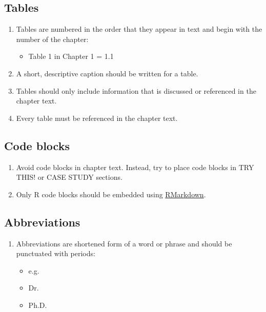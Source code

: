 \documentclass[
]{book}
\providecommand{\tightlist}{%
  \setlength{\itemsep}{0pt}\setlength{\parskip}{0pt}}
\begin{document}
\hypertarget{tables}{%
\subsection{Tables}\label{tables}}

\begin{enumerate}
\def\labelenumi{\arabic{enumi}.}
\tightlist
\item
  Tables are numbered in the order that they appear in text and begin with the number of the chapter:

  \begin{itemize}
  \tightlist
  \item
    Table 1 in Chapter 1 = 1.1
  \end{itemize}
\item
  A short, descriptive caption should be written for a table.
\item
  Tables should only include information that is discussed or referenced in the chapter text.
\item
  Every table must be referenced in the chapter text.
\end{enumerate}

\hypertarget{code-blocks}{%
\subsection{Code blocks}\label{code-blocks}}

\begin{enumerate}
\def\labelenumi{\arabic{enumi}.}
\tightlist
\item
  Avoid code blocks in chapter text. Instead, try to place code blocks in TRY THIS! or CASE STUDY sections.
\item
  Only R code blocks should be embedded using \href{https://bookdown.org/yihui/rmarkdown/r-code.html}{RMarkdown}.
\end{enumerate}

\hypertarget{abbreviations}{%
\subsection{Abbreviations}\label{abbreviations}}

\begin{enumerate}
\def\labelenumi{\arabic{enumi}.}
\tightlist
\item
  Abbreviations are shortened form of a word or phrase and should be punctuated with periods:

  \begin{itemize}
  \tightlist
  \item
    e.g.
  \item
    Dr.
  \item
    Ph.D.
  \end{itemize}
\end{enumerate}
\end{document}
